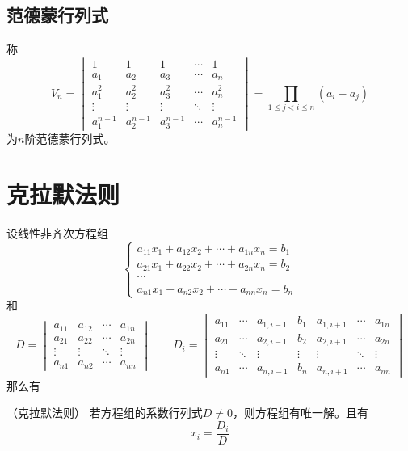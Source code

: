 \subsection{范德蒙行列式}
称
\begin{equation}
    \label{eq:范德蒙行列式}
    V_n =
    \begin{vmatrix}
        1         & 1         & 1         & \cdots & 1         \\
        a_1       & a_2       & a_3       & \cdots & a_n       \\
        a_1^2     & a_2^2     & a_3^2     & \cdots & a_n^2     \\
        \vdots    & \vdots    & \vdots    & \ddots & \vdots    \\
        a_1^{n-1} & a_2^{n-1} & a_3^{n-1} & \cdots & a_n^{n-1}
    \end{vmatrix}
    =
    \prod_{1\leq j < i \leq n} (a_i-a_j)
\end{equation}
为$n$阶范德蒙行列式。

\section{克拉默法则}
设线性非齐次方程组
\[
    \begin{cases}
        a_{11}x_1 + a_{12}x_2 + \cdots + a_{1n}x_n = b_1 \\
        a_{21}x_1 + a_{22}x_2 + \cdots + a_{2n}x_n = b_2 \\
        \cdots                                           \\
        a_{n1}x_1 + a_{n2}x_2 + \cdots + a_{nn}x_n = b_n
    \end{cases}
\]
和
\[
    D =
    \begin{vmatrix}
        a_{11} & a_{12} & \cdots & a_{1n} \\
        a_{21} & a_{22} & \cdots & a_{2n} \\
        \vdots & \vdots & \ddots & \vdots \\
        a_{n1} & a_{n2} & \cdots & a_{nn}
    \end{vmatrix}
    \qquad
    D_i =
    \begin{vmatrix}
        a_{11} & \cdots & a_{1,i-1} & b_1    & a_{1,i+1} & \cdots & a_{1n} \\
        a_{21} & \cdots & a_{2,i-1} & b_2    & a_{2,i+1} & \cdots & a_{2n} \\
        \vdots & \ddots & \vdots    & \vdots & \vdots    & \ddots & \vdots \\
        a_{n1} & \cdots & a_{n,i-1} & b_n    & a_{n,i+1} & \cdots & a_{nn}
    \end{vmatrix}
\]
那么有
\begin{theorem}
    （克拉默法则）
    \label{th:克拉默法则}
    若方程组的系数行列式$D\neq 0$，则方程组有唯一解。且有
    \[ x_i = \frac{D_i}{D} \]
\end{theorem}

